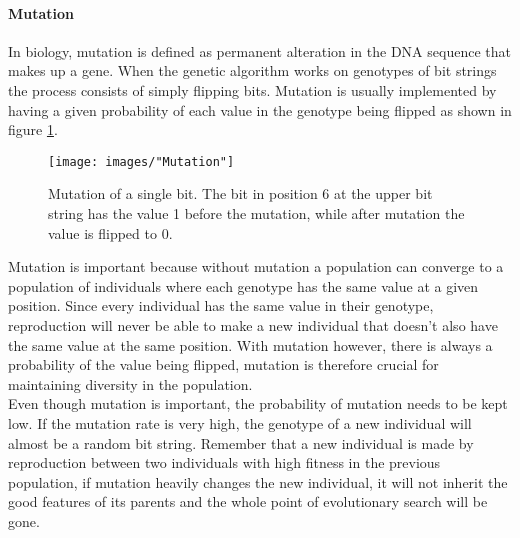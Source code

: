 \paragraph*{Mutation}
In biology, mutation is defined as permanent alteration in the DNA sequence that makes up a gene. When the genetic algorithm works on genotypes of bit strings the process consists of simply flipping bits. Mutation is usually implemented by having a given probability of each value in the genotype being flipped as shown in figure \ref{Mutation}.\\


\begin{figure}[h!]
\begin{center}
\texttt{[image: images/"Mutation"]}
\caption{Mutation of a single bit. The bit in position 6 at the upper bit string has the value 1 before the mutation, while after mutation the value is flipped to 0.}
\label{Mutation}
\end{center}
\end{figure}


\noindent Mutation is important because without mutation a population can converge to a population of individuals where each genotype has the same value at a given position. Since every individual has the same value in their genotype, reproduction will never be able to make a new individual that doesn't also have the same value at the same position. With mutation however, there is always a probability of the value being flipped, mutation is therefore crucial for maintaining diversity in the population.\\


\noindent Even though mutation is important, the probability of mutation needs to be kept low. If the mutation rate is very high, the genotype of a new individual will almost be a random bit string. Remember that a new individual is made by reproduction between two individuals with high fitness in the previous population, if mutation heavily changes the new individual, it will not inherit the good features of its parents and the whole point of evolutionary search will be gone.\\


